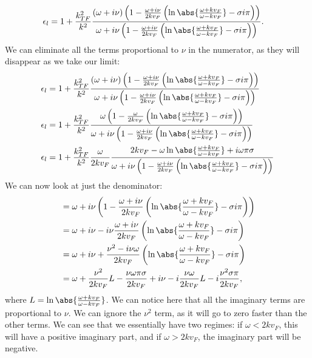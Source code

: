 \documentclass[../../main.tex]{subfiles}
\newcommand{\vf}{v_F}
\begin{document}
\begin{align}
 \epsilon_l &= 1 + \frac{k_{TF}^2}{k^2} \frac{\left(\omega + i \nu \right) \left( 1 - \frac{\omega + i \nu}{2 k\vf} \left(\ln\abs{\frac{\omega + k\vf}{\omega - k\vf}} - \sigma i \pi\right)\right)}{\omega + i \nu\left( 1 - \frac{\omega + i \nu}{2 k\vf} \left(\ln\abs{\frac{\omega + k\vf}{\omega - k\vf}} - \sigma i \pi\right)\right)}.
\end{align}
We can eliminate all the terms proportional to $\nu$ in the numerator, as they will disappear as we take our limit:
\begin{align}
	\epsilon_l &= 1 + \frac{k_{TF}^2}{k^2} \frac{\left(\omega + i \nu \right) \left( 1 - \frac{\omega + i \nu}{2 k\vf} \left(\ln\abs{\frac{\omega + k\vf}{\omega - k\vf}} - \sigma i \pi\right)\right)}{\omega + i \nu\left( 1 - \frac{\omega + i \nu}{2 k\vf} \left(\ln\abs{\frac{\omega + k\vf}{\omega - k\vf}} - \sigma i \pi\right)\right)} \\
	\epsilon_l &= 1 + \frac{k_{TF}^2}{k^2} \frac{\omega \left( 1 - \frac{\omega}{2 k\vf} \left(\ln\abs{\frac{\omega + k\vf}{\omega - k\vf}} - \sigma i \pi\right)\right)}{\omega + i \nu\left( 1 - \frac{\omega + i \nu}{2 k\vf} \left(\ln\abs{\frac{\omega + k\vf}{\omega - k\vf}} - \sigma i \pi\right)\right)} \\
	\epsilon_l &= 1 + \frac{k_{TF}^2}{k^2} \frac{\omega}{2 k \vf} \frac{ 2 k\vf - \omega \ln\abs{\frac{\omega + k\vf}{\omega - k\vf}} + i \omega \pi \sigma}{\omega + i \nu\left( 1 - \frac{\omega + i \nu}{2 k\vf} \left(\ln\abs{\frac{\omega + k\vf}{\omega - k\vf}} - \sigma i \pi\right)\right)} \label{eq:LindhardExplicitParts:NumeratorSimp}
\end{align}
We can now look at just the denominator:
\begin{align}
	&= \omega + i \nu\left( 1 - \frac{\omega + i \nu}{2 k\vf} \left(\ln\abs{\frac{\omega + k\vf}{\omega - k\vf}} - \sigma i \pi\right)\right) \\
	&= \omega + i \nu - i\nu\frac{\omega + i \nu}{2 k\vf} \left(\ln\abs{\frac{\omega + k\vf}{\omega - k\vf}} - \sigma i \pi\right) \\
	&= \omega + i \nu + \frac{\nu^2 - i \nu \omega}{2 k \vf}  \left(\ln\abs{\frac{\omega + k\vf}{\omega - k\vf}} - \sigma i \pi\right) \\
	&= \omega + \frac{\nu^2}{2 k \vf} L - \frac{\nu \omega \pi \sigma}{2 k \vf} + i\nu - i\frac{\nu \omega}{2 k \vf} L - i \frac{\nu^2 \sigma \pi}{2 k \vf},
\end{align}
where $L = \ln\abs{\frac{\omega + k\vf}{\omega - k\vf}}$. We can notice here that all the imaginary terms are proportional to $\nu$. We can ignore the $\nu^2$ term, as it will go to zero faster than the other terms. We can see that we essentially have two regimes: if $\omega < 2 k\vf$, this will have a positive imaginary part, and if $\omega > 2k\vf$, the imaginary part will be negative.
\end{document}
